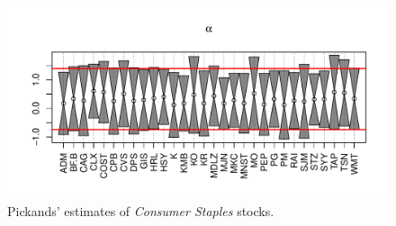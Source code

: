 \documentclass{article}
\newcommand{\1}[1]{
  \mathbf{1}_{\{#1\}}
}
\begin{document}
\begin{figure}[htb!]
  \includegraphics[width=\textwidth]{Consumer_Staples_Pickands.pdf}
  \caption{Pickands' estimates of {\it Consumer Staples} stocks.}
  \label{fig:Consumer_Staples_Pickands}
\end{figure}


\end{document}
